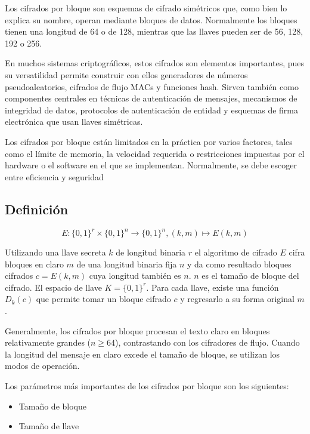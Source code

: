 %
%

Los cifrados por bloque son esquemas de cifrado simétricos que, como bien 
lo explica su nombre, operan mediante bloques de datos. Normalmente los 
bloques tienen una longitud de 64 o de 128, mientras que las llaves 
pueden ser de 56, 128, 192 o 256.

En muchos sistemas criptográficos, estos cifrados son elementos 
importantes, pues su versatilidad permite construir con ellos 
generadores de números pseudoaleatorios, cifrados de flujo MACs y 
funciones hash. Sirven también como componentes centrales en técnicas de 
autenticación de mensajes, mecanismos de integridad de datos, protocolos 
de autenticación de entidad y esquemas de firma electrónica que usan 
llaves simétricas. 

Los cifrados por bloque están limitados en la práctica por varios 
factores, tales como el límite de memoria, la velocidad requerida o 
restricciones impuestas por el hardware o el software en el que se 
implementan. Normalmente, se debe escoger entre eficiencia y seguridad

\subsection{Definición}

\begin{equation}
  \label{cifrado_bloques_def}
 	E: \{0,1\}^r \times \{0,1\}^n \longrightarrow \{0,1\}^n, (k,m) 
	\longmapsto  E(k,m)
\end{equation}


Utilizando una llave secreta $k$ de longitud binaria $r$ el algoritmo de 
cifrado $E$ cifra bloques en claro $m$ de una longitud binaria fija $n$ y 
da como resultado bloques cifrados $c = E (k,m)$ cuya longitud también es 
$n$. $n$ es el tamaño de bloque del cifrado. 
El espacio de llave $K = \{0,1\}^r$. Para cada llave, existe una función 
$D_k(c)$ que permite tomar un bloque cifrado $c$ y regresarlo a su forma 
original $m$.

Generalmente, los cifrados por bloque procesan el texto claro en bloques 
relativamente grandes ($n \geq 64$), contrastando con los cifradores de 
flujo. Cuando la longitud del mensaje en claro excede el tamaño de 
bloque, se utilizan los modos de operación.

Los parámetros más importantes de los cifrados por bloque son los 
siguientes:
\begin{itemize}
	\item Tamaño de bloque
	\item Tamaño de llave
\end{itemize}

